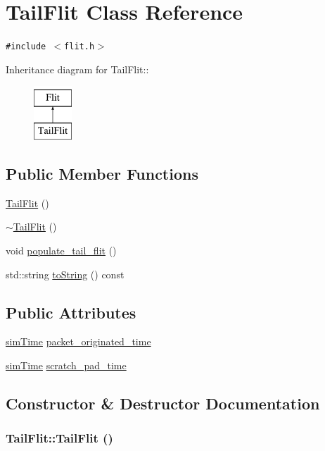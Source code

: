 \hypertarget{classTailFlit}{
\section{TailFlit Class Reference}
\label{classTailFlit}
}
{\tt \#include $<$flit.h$>$}

Inheritance diagram for TailFlit::\begin{figure}[H]
\begin{center}
\leavevmode
\includegraphics[height=2cm]{classTailFlit}
\end{center}
\end{figure}
\subsection*{Public Member Functions}
\begin{CompactItemize}
\item 
\hyperlink{classTailFlit_03bfca3c1eeb7442a8f497ffcc27a716}{TailFlit} ()
\item 
\hyperlink{classTailFlit_cec72c081d6ca5585b3f8cd1402f4783}{$\sim$TailFlit} ()
\item 
void \hyperlink{classTailFlit_76f8023394ec32a7038300b285bfd5fd}{populate\_\-tail\_\-flit} ()
\item 
std::string \hyperlink{classTailFlit_fb1c83457c5d834a8a859269154e3c4d}{toString} () const 
\end{CompactItemize}
\subsection*{Public Attributes}
\begin{CompactItemize}
\item 
\hyperlink{genericComponentHeader_8h_d88faca783e7aa496cda721d9029a2e3}{simTime} \hyperlink{classTailFlit_acb87776196c1156133039e53abf8175}{packet\_\-originated\_\-time}
\item 
\hyperlink{genericComponentHeader_8h_d88faca783e7aa496cda721d9029a2e3}{simTime} \hyperlink{classTailFlit_a347d251f3904ba5f7717cae21b3520b}{scratch\_\-pad\_\-time}
\end{CompactItemize}


\subsection{Constructor \& Destructor Documentation}
\hypertarget{classTailFlit_03bfca3c1eeb7442a8f497ffcc27a716}{
\subsubsection[{TailFlit}]{\setlength{\rightskip}{0pt plus 5cm}TailFlit::TailFlit ()}}
\label{classTailFlit_03bfca3c1eeb7442a8f497ffcc27a716}


